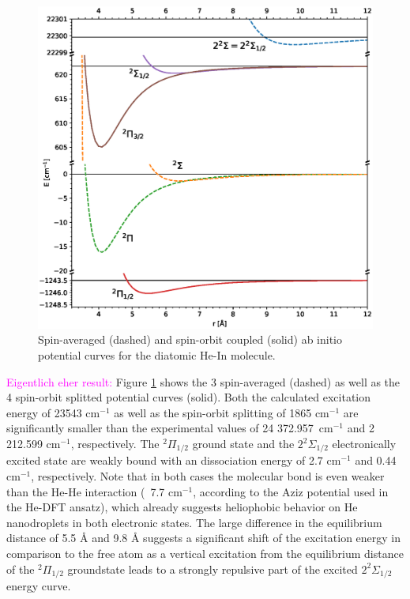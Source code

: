 \documentclass[twoside,twocolumn,9pt]{article}
\def\hl#1{\textcolor{magenta}{#1}}  %
\begin{document}
\begin{figure}[h!]
  	\begin{center}
 		\includegraphics[width=\columnwidth]{in_pot.eps}
                \caption{Spin-averaged (dashed) and spin-orbit coupled (solid) ab initio potential curves for the diatomic He-In molecule. \label{pic:pes}}
  	\end{center}
\end{figure}
\hl{Eigentlich eher result:}
Figure \ref{pic:pes} shows the 3 spin-averaged (dashed) as well as the 4 spin-orbit splitted potential curves (solid). Both the calculated excitation energy of 23543 cm$^{-1}$ as well as the spin-orbit splitting of 1865 cm$^{-1}$ are significantly smaller than the experimental values of 24 372.957~cm$^{-1}$ and 2 212.599 cm$^{-1}$, respectively. \cite{NIST} The $^2\Pi_{1/2}$ ground state and the $2^2\Sigma{}_{1/2}$ electronically excited state are weakly bound with an dissociation energy of 2.7 cm$^{-1}$ and 0.44 cm$^{-1}$, respectively. Note that in both cases the molecular bond is even weaker than the He-He interaction (~7.7 cm$^{-1}$, according to the Aziz potential\cite{Janzen:1997hv} used in the He-DFT ansatz), which already suggests heliophobic behavior on He nanodroplets in both electronic states. The large difference in the equilibrium distance of 5.5 \AA{} and 9.8 \AA{} suggests a significant shift of the excitation energy in comparison to the free atom as a vertical excitation from the equilibrium distance of the $^2\Pi_{1/2}$ groundstate leads to a strongly repulsive part of the excited $2^2\Sigma{}_{1/2}$ energy curve. 
\end{document}
